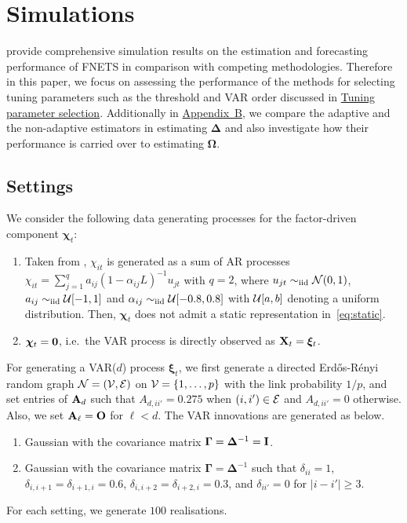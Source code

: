\section{Simulations}
\label{sec:sim}

\cite{barigozzi2022fnets} provide comprehensive simulation results on the estimation and forecasting performance of FNETS in comparison with competing methodologies.
Therefore in this paper, we focus on assessing the performance of the methods for selecting tuning parameters such as the threshold and VAR order discussed in \hyperref[sec:tuning]{Tuning parameter selection}.
Additionally in \hyperref[sec:sim:adaptive]{Appendix~B}, we compare the adaptive and the non-adaptive estimators in estimating $\bm\Delta$ and also investigate how their performance is carried over to estimating $\bm\Omega$.

\subsection{Settings}

We consider the following data generating processes for the factor-driven component $\bm\chi_t$:
\begin{enumerate}[label = (C\arabic*)]
\item \label{m:ar} Taken from \cite{forni2017dynamic},
$\chi_{it}$ is generated as a sum of AR processes
$\chi_{it} = \sum_{j = 1}^q a_{ij} (1 - \alpha_{ij} L)^{-1} u_{jt}$ with $q = 2$,
where $u_{jt} \sim_{\text{\upshape iid}} \mathcal N(0, 1)$, $a_{ij} \sim_{\text{\upshape iid}} \mathcal U[-1, 1]$ and $\alpha_{ij} \sim_{\text{\upshape iid}} \mathcal U[-0.8, 0.8]$ with $\mathcal U[a, b]$ denoting a uniform distribution.
Then, $\bm\chi_t$ does not admit a static representation in~\eqref{eq:static}.

\item \label{m:oracle} $\bm\chi_t = \mathbf 0$, i.e.\ the VAR process is directly observed as $\mathbf X_t = \bm\xi_t$.
\end{enumerate}

For generating a VAR($d$) process $\bm\xi_t$, we first generate a directed Erd\H{o}s-R\'{e}nyi random graph $\mathcal N = (\mathcal V, \mathcal E)$ on $\mathcal V = \{1, \ldots, p\}$ with the link probability $1/p$, and set entries of $\mathbf A_d$ such that $A_{d, ii'} = 0.275$ when $(i, i') \in \mathcal E$ and $A_{d, ii'} = 0$ otherwise. 
Also, we set $\mathbf A_\ell = \mathbf O$ for $\ell < d$.
The VAR innovations are generated as below.
\begin{enumerate}[label = (E\arabic*)]
\item \label{e:one} Gaussian with the covariance matrix $\bm\Gamma = \bm\Delta^{-1} = \mathbf I$.

\item \label{e:four} Gaussian with the covariance matrix $\bm\Gamma = \bm\Delta^{-1}$ such that $\delta_{ii} = 1$, $\delta_{i, i + 1} = \delta_{i + 1, i} = 0.6$, $\delta_{i, i + 2} = \delta_{i + 2, i} = 0.3$, and $\delta_{ii'} = 0$ for $\vert i - i' \vert \ge 3$.
\end{enumerate}
For each setting, we generate $100$ realisations.

